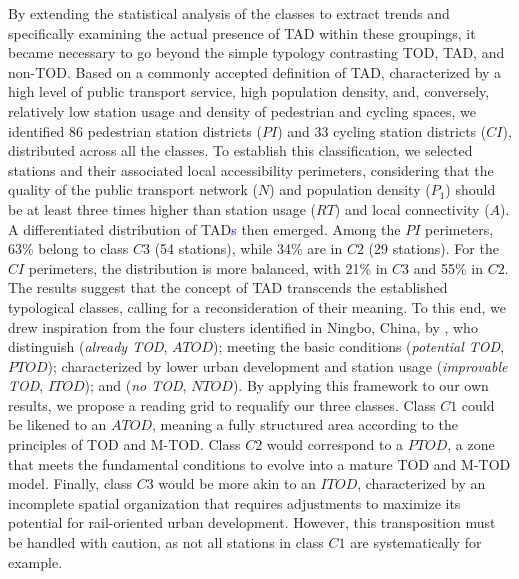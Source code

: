\begin{refsegment}
By extending the statistical analysis of the classes to extract trends and specifically examining the actual presence of \acrshort{TAD} within these groupings, it became necessary to go beyond the simple typology contrasting \acrshort{TOD}, \acrshort{TAD}, and non-\acrshort{TOD}. Based on a commonly accepted definition of \acrshort{TAD}, characterized by a high level of public transport service, high population density, and, conversely, relatively low station usage and density of pedestrian and cycling spaces, we identified 86 pedestrian station districts (\(PI\)) and 33 cycling station districts (\(CI\)), distributed across all the classes. To establish this classification, we selected stations and their associated local accessibility perimeters, considering that the quality of the public transport network (\(N\)) and population density (\(P_1\)) should be at least three times higher than station usage (\(RT\)) and local connectivity (\(A\)). A differentiated distribution of \acrshort{TAD}\textcolor{blue}{s} then emerged. Among the \(PI\) perimeters, 63\% belong to class \(C3\) (54 stations), while 34\% are in \(C2\) (29 stations). For the \(CI\) perimeters, the distribution is more balanced, with 21\% in \(C3\) and 55\% in \(C2\). The results suggest that the concept of \acrshort{TAD} transcends the established typological classes, calling for a reconsideration of their meaning. To this end, we drew inspiration from the four clusters identified in Ningbo, China, by \textcolor{blue}{\textcite[249]{yang_tod_2021}}, who distinguish  (\textsl{already TOD}, \(ATOD\));  meeting the basic conditions (\textsl{potential TOD}, \(PTOD\));  characterized by lower urban development and station usage (\textsl{improvable TOD}, \(ITOD\)); and  (\textsl{no TOD}, \(NTOD\)). By applying this framework to our own results, we propose a reading grid to requalify our three classes. Class \(C1\) could be likened to an \(ATOD\), meaning a fully structured area according to the principles of \acrshort{TOD} and \acrshort{M-TOD}. Class \(C2\) would correspond to a \(PTOD\), a zone that meets the fundamental conditions to evolve into a mature \acrshort{TOD} and \acrshort{M-TOD} model. Finally, class \(C3\) would be more akin to an \(ITOD\), characterized by an incomplete spatial organization that requires adjustments to maximize its potential for rail-oriented urban development. However, this transposition must be handled with caution, as not all stations in class \(C1\) are systematically  for example.%


\end{refsegment}
